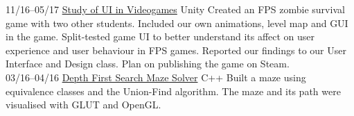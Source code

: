 \documentclass[]{friggeri-cv}
\begin{document}
\begin{entrylist}

 \entry
    {11/16–05/17}
    {\href{https://connect.unity.com/u/5839ddf732b306002a9e7422}{Study of UI in Videogames}}
    {Unity}
    {{Created an FPS zombie survival game with two other students. Included our own animations, level map and GUI in the game. Split-tested game UI to better understand its affect on user experience and user behaviour in FPS games. Reported our findings to our User Interface and Design class. Plan on publishing the game on Steam.\\}%
    }
 \entry
    {03/16–04/16}
    {\href{https://github.com/nguyen-khoa/CS200Lab4}{Depth First Search Maze Solver}}
    {C++}
    {Built a maze using equivalence classes and the Union-Find algorithm. The maze and its path were visualised with GLUT and OpenGL. \\}
 \end{entrylist}
\end{document}
